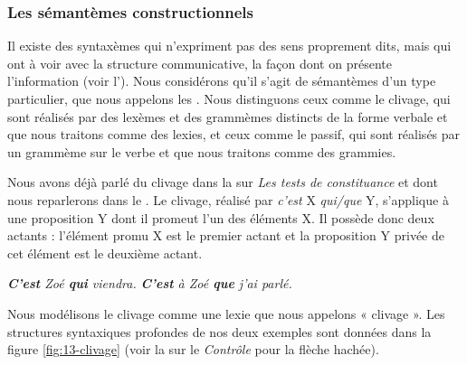 \subsubsection{Les sémantèmes constructionnels} 
Il existe des syntaxèmes qui n’expriment pas des sens proprement dits, mais qui ont à voir avec la structure communicative, la façon dont on présente l’information (voir l’). Nous considérons qu’il s’agit de sémantèmes d’un type particulier, que nous appelons les . Nous distinguons ceux comme le clivage, qui sont réalisés par des lexèmes et des grammèmes distincts de la forme verbale et que nous traitons comme des lexies, et ceux comme le passif, qui sont réalisés par un grammème sur le verbe et que nous traitons comme des grammies.

Nous avons déjà parlé du clivage dans la  sur \textit{Les tests de constituance} et dont nous reparlerons dans le . Le clivage, réalisé par \textit{c’est} X \textit{qui/que} Y, s’applique à une proposition Y dont il promeut l’un des éléments X. Il possède donc deux actants : l’élément promu X est le premier actant et la proposition Y privée de cet élément est le deuxième actant.

\ea\label{ex:13-clivage}
\ea \textit{\textbf{C’est} Zoé \textbf{qui} viendra.}
\ex \textit{\textbf{C’est} à Zoé \textbf{que} j’ai parlé.}\z\z

Nous modélisons le clivage comme une lexie que nous appelons « clivage ». Les structures syntaxiques profondes de nos deux exemples sont données dans la figure \ref{fig:13-clivage} (voir la  sur le \textit{Contrôle} pour la flèche hachée).

